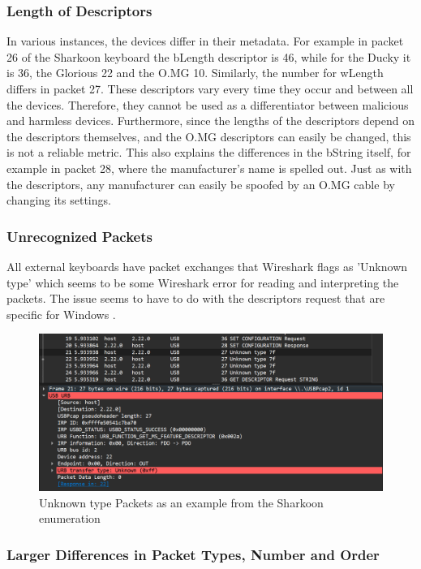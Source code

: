 \subsubsection{Length of Descriptors}

In various instances, the devices differ in their metadata. For example in packet 26 of the Sharkoon keyboard the bLength descriptor is 46, while for the Ducky it is 36, the Glorious 22 and the O.MG 10. Similarly, the number for wLength differs in packet 27. These descriptors vary every time they occur and between all the devices. Therefore, they cannot be used as a differentiator between malicious and harmless devices. Furthermore, since the lengths of the descriptors depend on the descriptors themselves, and the O.MG descriptors can easily be changed, this is not a reliable metric.
This also explains the differences in the bString itself, for example in packet 28, where the manufacturer's name is spelled out. Just as with the descriptors, any manufacturer can easily be spoofed by an O.MG cable by changing its settings. 


\subsubsection{Unrecognized Packets}

All external keyboards have packet exchanges that Wireshark flags as 'Unknown type' which seems to be some Wireshark error for reading and interpreting the packets. The issue seems to have to do with the descriptors request that are specific for Windows \cite{USBPcapDidNot}.

\begin{figure}[H]
    \centering
    \includegraphics[width=0.75\linewidth]{visuals/unknownPacketsSharkoon.png}
    \caption{Unknown type Packets as an example from the Sharkoon enumeration}
    \label{fig:unknownPacketsSharkoon}
\end{figure}


\subsubsection{Larger Differences in Packet Types, Number and Order}

